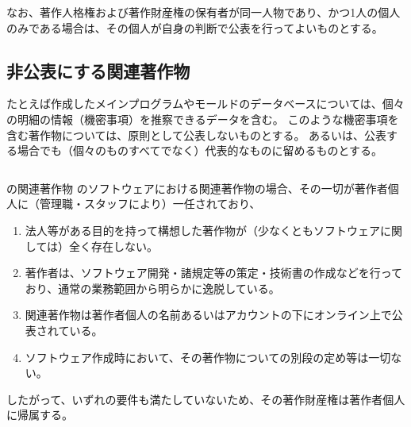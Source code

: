 なお、著作人格権および著作財産権の保有者が同一人物であり、かつ1人の個人のみである場合は、その個人が自身の判断で公表を行ってよいものとする。


\subsection{非公表にする関連著作物}
たとえば作成したメインプログラムやモールドのデータベースについては、個々の明細の情報（機密事項）を推察できるデータを含む。
このような機密事項を含む著作物については、原則として公表しないものとする。
あるいは、公表する場合でも（個々のものすべてでなく）代表的なものに留めるものとする。



\clearpage
\begin{Column}{\DMname の関連著作物}
\DMname のソフトウェアにおける関連著作物の場合、その一切が著作者個人に（管理職・スタッフにより）一任されており、
\begin{enumerate}[label=\Roman*]
\item 法人等がある目的を持って構想した著作物が（少なくともソフトウェアに関しては）全く存在しない。
\item 著作者は、ソフトウェア開発・諸規定等の策定・技術書の作成などを行っており、通常の業務範囲から明らかに逸脱している。
\item 関連著作物は著作者個人の名前あるいはアカウントの下にオンライン上で公表されている。
\item ソフトウェア作成時において、その著作物についての別段の定め等は一切ない。
\end{enumerate}
したがって、いずれの要件も満たしていないため、その著作財産権は著作者個人に帰属する。
\end{Column}




